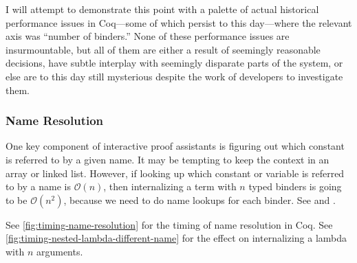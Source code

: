 I will attempt to demonstrate this point with a palette of actual historical performance issues in Coq---some of which persist to this day---where the relevant axis was ``number of binders.''
None of these performance issues are insurmountable, but all of them are either a result of seemingly reasonable decisions, have subtle interplay with seemingly disparate parts of the system, or else are to this day still mysterious despite the work of developers to investigate them.

\subsubsection{Name Resolution} \label{sec:name-resolution}
One key component of interactive proof assistants is figuring out which constant is referred to by a given name.
It may be tempting to keep the context in an array or linked list.
However, if looking up which constant or variable is referred to by a name is $\mathcal O(n)$, then internalizing a term with $n$ typed binders is going to be $\mathcal O(n^2)$, because we need to do name lookups for each binder.
See  and .

See \autoref{fig:timing-name-resolution} for the timing of name resolution in Coq.
See \autoref{fig:timing-nested-lambda-different-name} for the effect on internalizing a lambda with $n$ arguments.

